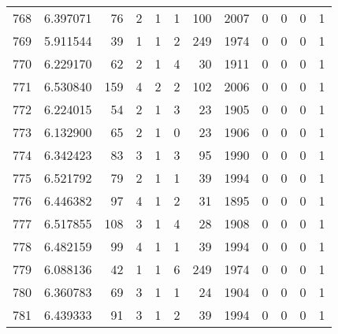 \begin{tabular}{lrrrrrrrrrrr}
768 &  6.397071 &   76 &      2 &        1 &      1 &             100 &  2007 &               0 &               0 &               0 &               1 \\
769 &  5.911544 &   39 &      1 &        1 &      2 &             249 &  1974 &               0 &               0 &               0 &               1 \\
770 &  6.229170 &   62 &      2 &        1 &      4 &              30 &  1911 &               0 &               0 &               0 &               1 \\
771 &  6.530840 &  159 &      4 &        2 &      2 &             102 &  2006 &               0 &               0 &               0 &               1 \\
772 &  6.224015 &   54 &      2 &        1 &      3 &              23 &  1905 &               0 &               0 &               0 &               1 \\
773 &  6.132900 &   65 &      2 &        1 &      0 &              23 &  1906 &               0 &               0 &               0 &               1 \\
774 &  6.342423 &   83 &      3 &        1 &      3 &              95 &  1990 &               0 &               0 &               0 &               1 \\
775 &  6.521792 &   79 &      2 &        1 &      1 &              39 &  1994 &               0 &               0 &               0 &               1 \\
776 &  6.446382 &   97 &      4 &        1 &      2 &              31 &  1895 &               0 &               0 &               0 &               1 \\
777 &  6.517855 &  108 &      3 &        1 &      4 &              28 &  1908 &               0 &               0 &               0 &               1 \\
778 &  6.482159 &   99 &      4 &        1 &      1 &              39 &  1994 &               0 &               0 &               0 &               1 \\
779 &  6.088136 &   42 &      1 &        1 &      6 &             249 &  1974 &               0 &               0 &               0 &               1 \\
780 &  6.360783 &   69 &      3 &        1 &      1 &              24 &  1904 &               0 &               0 &               0 &               1 \\
781 &  6.439333 &   91 &      3 &        1 &      2 &              39 &  1994 &               0 &               0 &               0 &               1 \\

\end{tabular}
